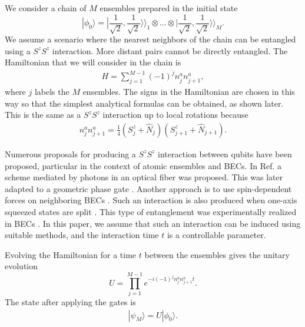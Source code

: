 \documentclass[%
  prx,%
  twocolumn,%
  preprintnumbers,%
  amsmath,%
  amssymb,%
  superscriptaddress%
]{revtex4}
\begin{document}

We consider a chain of $ M $ ensembles prepared in the initial state
%
%
\begin{equation}
|\phi_0 \rangle=|\frac{1}{\sqrt{2}},\frac{1}{\sqrt{2}}\rangle\rangle_{1}\otimes\dots\otimes|\frac{1}{\sqrt{2}},\frac{1}{\sqrt{2}}\rangle\rangle_{M} .  \label{initstate}
\end{equation}
%
We assume a scenario where the nearest neighbors of the chain can be entangled using a $ S^z S^z $  interaction. More distant pairs cannot be directly entangled.  The Hamiltonian that we will consider in the chain is
%
\begin{align}
H=  \sum_{j=1}^{M-1} (-1)^j n_j^a n_{j+1}^a , 
\label{mainham}
\end{align}
%
where $ j$ labels the  $M $ ensembles. The signs in the Hamiltonian are chosen in this way so that the simplest analytical formulas can be obtained, as shown later.  
 This is the same as a $ S^z S^z $ interaction up to local rotations because
%
\begin{align}
n^a_j n_{j+1}^a = \frac{1}{4} (S^z_j + \hat{N}_j) (S^z_{j+1} + \hat{N}_{j+1} ).  
\end{align}

Numerous proposals for producing a $ S^z S^z $ interaction between qubits have been proposed, particular in the context of atomic ensembles and BECs.  In Ref. \cite{pyrkov2013entanglement} a scheme mediated by photons in an optical fiber was proposed.  This was later adapted to a geometric phase gate \cite{hussain2014geometric}. Another approach is to use spin-dependent forces on neighboring BECs \cite{treutlein2006}.  
Such an interaction is also produced when one-axis squeezed states are split \cite{Jing_2019}.  This type of entanglement was  experimentally realized in BECs \cite{fadel2018spatial,Colciaghi2023}.  In this paper, we assume that such an interaction can be induced using suitable methods, and the interaction time $ t $ is a controllable parameter. 

Evolving the Hamiltonian for a time $ t $ between the ensembles gives the unitary evolution
%
\begin{equation}
U=\prod^{M-1}_{j=1} e^{- i (-1)^j  n^a_j n^a_{j+1} t} . 
\end{equation}
%
The state after applying the gates is
%
\begin{align}
|\psi_M \rangle = U | \phi_0 \rangle . 
\end{align}
\end{document}
